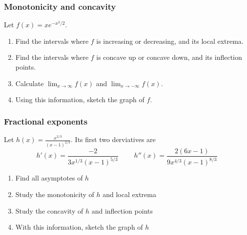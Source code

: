 \documentclass[14pt]{beamer}
\begin{document}

	\begin{frame}[t]
		\frametitle{Monotonicity and concavity}

		Let $\displaystyle f(x) = x e^{-x^2/2}$.

		\begin{enumerate}
			\item Find the intervals where $f$ is increasing or decreasing, and its
				local extrema.

			\item Find the intervals where $f$ is concave up or concave down, and its
				inflection points.

			\item Calculate $\displaystyle \lim_{x \to \infty}f(x)$ and $\displaystyle
				\lim_{x \to - \infty}f(x)$.

			\item Using this information, sketch the graph of $f$.
		\end{enumerate}
	\end{frame}

	\begin{frame}[t]
		\frametitle{Fractional exponents}

		Let $\displaystyle h(x) = \frac{x^{2/3}}{(x-1)^{2/3}}$. Its first two derviatives
		are
		\begin{equation*}
			h'(x) = \frac{-2}{3x^{1/3}(x-1)^{5/3}}\; \quad \quad h''(x) = \frac{2(6x-1)}{9x^{4/3}(x-1)^{8/3}}
		\end{equation*}

		\begin{enumerate}
			\item Find all asymptotes of $h$

			\item Study the monotonicity of $h$ and local extrema

			\item Study the concavity of $h$ and inflection points

			\item With this information, sketch the graph of $h$
		\end{enumerate}
	\end{frame}
\end{document}
